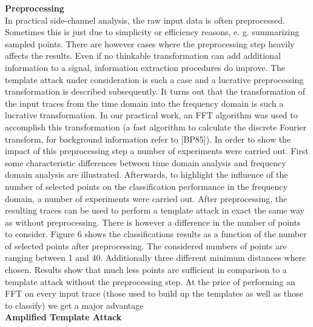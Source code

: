 \textbf{Preprocessing}\\
    In practical side-channel analysis, the raw input data is often
    preprocessed. Sometimes this is just due to simplicity or efficiency
    reasons, e. g. summarizing sampled points. There are however cases where the
    preprocessing step heavily affects the results. Even if no thinkable
    transformation can add additional information to a signal, information
    extraction procedures do improve. The template attack under consideration is
    such a case and a lucrative preprocessing transformation is described
    subsequently. It turns out that the transformation of the input traces from
    the time domain into the frequency domain is such a lucrative
    transformation. In our practical work, an FFT algorithm was used to
    accomplish this transformation (a fast algorithm to calculate the discrete
    Fourier transform, for background information refer to [BP85]). In order to
    show the impact of this preprocessing step a number of experiments were
    carried out. First some characteristic differences between time domain
    analysis and frequency domain analysis are illustrated. Afterwards, to
    highlight the influence of the number of selected points on the
    classification performance in the frequency domain, a number of experiments
    were carried out. After preprocessing, the resulting traces can be used to
    perform a template attack in exact the same way as without preprocessing.
    There is however a difference in the number of points to consider. Figure 6
    shows the classifications results as a function of the number of selected
    points after preprocessing. The considered numbers of points are ranging
    between 1 and 40. Additionally three different minimum distances where
    chosen. Results show that much less points are sufficient in comparison to a
    template attack without the preprocessing step. At the price of performing
    an FFT on every input trace (those used to build up the templates as well as
    those to classify) we get a major advantage\\


\textbf{Amplified Template Attack}


